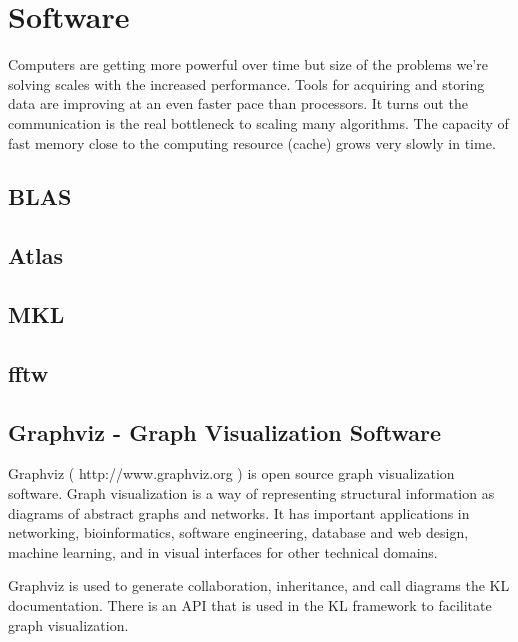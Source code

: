 
\chapter{Software}

Computers are getting more powerful over time but size of the problems we're solving scales with the increased performance. Tools for acquiring and storing data are improving at an even faster pace than processors.  It turns out the communication is the real bottleneck to scaling many algorithms. The capacity of fast memory close to the computing resource (cache) grows very slowly in time.


\section{BLAS }

\section{Atlas}

\section{MKL}

\section{fftw}

\section{Graphviz - Graph Visualization Software}
Graphviz ( http://www.graphviz.org ) is open source graph visualization software. Graph visualization is a way of representing structural information as diagrams of abstract graphs and networks. It has important applications in networking, bioinformatics,  software engineering, database and web design, machine learning, and in visual interfaces for other technical domains.

Graphviz is used to generate collaboration, inheritance, and call diagrams the KL documentation. There is an API that is used in the KL framework to facilitate graph visualization.

